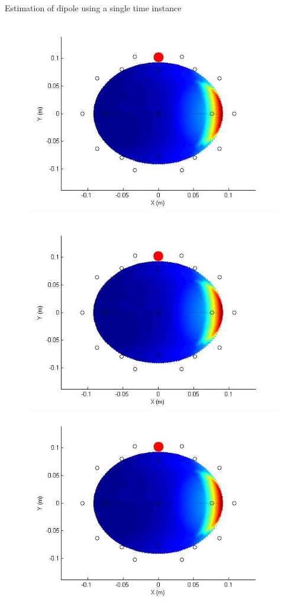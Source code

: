 \documentclass[t,12pt,english
\ifx\beamermode\undefined\else,\beamermode\fi
]{beamer}
\begin{document}
\begin{frame}{Estimation of dipole using a single time instance}
\begin{figure}[!htbp]
\endminipage\hfill
{}%
\centering
\includegraphics[width=1\textwidth]{15.jpg}

\endminipage\hfill
{}%
\centering
\includegraphics[width=1\textwidth]{16.jpg}
\endminipage\hfill
{}%
\centering
\includegraphics[width=1\textwidth]{17.jpg}


\end{figure}
\end{frame}
\end{document}
